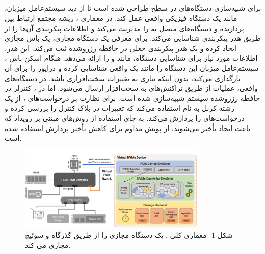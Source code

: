\documentclass[12pt]{article}
\begin{document}
\subsection*{}
 برای شبیه‌سازی دستگاه‌های  در سطح  طراحی شده است تا از دید سیستم‌عامل میزبان، مانند یک دستگاه فیزیکی واقعی عمل کند. در معماری ، ریشه مجتمع  ارتباط بین پردازنده و دستگاه‌های متصل به  را مدیریت می‌کند و اطلاعات پیکربندی آن‌ها را از طریق هدر پیکربندی  شناسایی می‌کند. \newline
{} برای معرفی یک دستگاه  مجازی، یک باس  مجازی ایجاد کرده و یک هدر پیکربندی  جعلی در حافظه رزرو‌شده ثبت می‌کند. این هدر، اطلاعات مورد نیاز برای شناسایی دستگاه، مانند  و  را ارائه می‌دهد. هنگام اسکن باس ، سیستم‌عامل میزبان این دستگاه را مانند یک  واقعی شناسایی کرده و درایور  را برای آن بارگذاری می‌کند، بدون اینکه نیازی به تغییرات سخت‌افزاری باشد. \newline
در دستگاه‌های واقعی، عملیات  از طریق تراکنش‌های  به سخت‌افزار  ارسال می‌شود. اما در ، کنترلر  در حافظه رزرو‌شده سیستم شبیه‌سازی شده است. برای نظارت بر درخواست‌های ،  از یک رشته کرنل به نام  استفاده می‌کند که تغییرات در بلاک کنترل  را بررسی کرده و درخواست‌های  را پردازش می‌کند. به جای استفاده از روش‌های مبتنی بر رویداد  که باعث ایجاد تأخیر می‌شوند، از پویش مداوم  برای کاهش تأخیر پردازش استفاده شده است. \newline
\begin{figure}[h]
    \centering
    \includegraphics[width=0.8\textwidth]{NVMeVirt.png}
    \caption{شکل 1- معماری کلی .  یک دستگاه  مجازی را از طریق گذرگاه و سوئیچ  مجازی می کند.}
\end{figure}
\newpage
\end{document}

